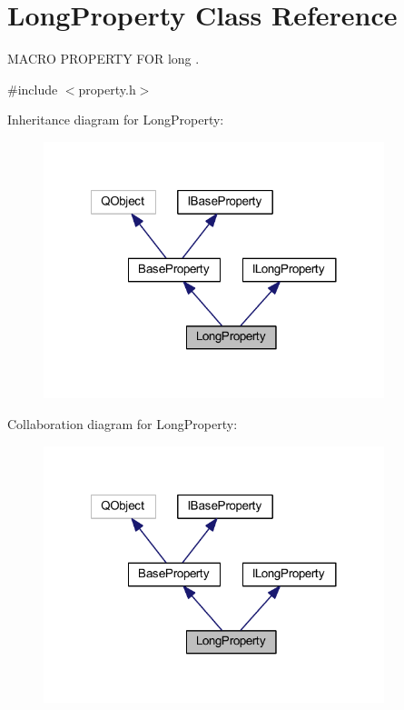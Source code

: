 \hypertarget{class_long_property}{\section{Long\-Property Class Reference}
\label{class_long_property}
}


M\-A\-C\-R\-O P\-R\-O\-P\-E\-R\-T\-Y F\-O\-R long .  




{\ttfamily \#include $<$property.\-h$>$}



Inheritance diagram for Long\-Property\-:
\nopagebreak
\begin{figure}[H]
\begin{center}
\leavevmode
\includegraphics[width=281pt]{class_long_property__inherit__graph}
\end{center}
\end{figure}


Collaboration diagram for Long\-Property\-:
\nopagebreak
\begin{figure}[H]
\begin{center}
\leavevmode
\includegraphics[width=281pt]{class_long_property__coll__graph}
\end{center}
\end{figure}
